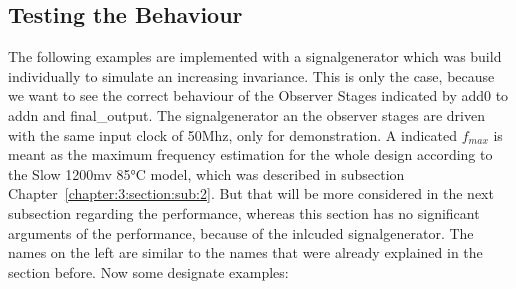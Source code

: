\subsection{Testing the Behaviour}
The following examples are implemented with a signalgenerator which was build individually to simulate an increasing invariance.
This is only the case, because we want to see the correct behaviour of the Observer Stages indicated by add0 to addn and final\_output.
The signalgenerator an the observer stages are driven with the same input clock of 50Mhz, only for demonstration.
A indicated $f_{max}$ is meant as the maximum frequency estimation for the whole design according to the Slow 1200mv 85°C model, which was described in subsection Chapter~\ref{chapter:3:section:sub:2}.
But that will be more considered in the next subsection regarding the performance, whereas this section has no significant arguments of the performance, because of the inlcuded signalgenerator.
The names on the left are similar to the names that were already explained in the section before. Now some designate examples:\\
\\

